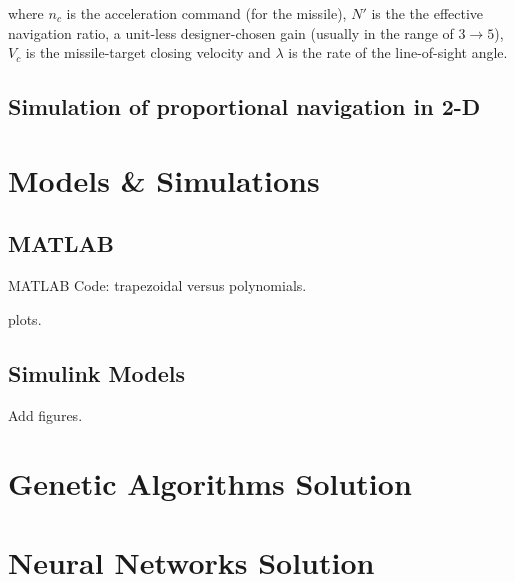 where $n_c$ is the acceleration command (for the missile), $N'$ is the the effective navigation ratio, a unit-less designer-chosen gain (usually in the range of $3 \to 5$), $V_c$ is the missile-target closing velocity and $\lambda$ is the rate of the line-of-sight angle.


\subsection*{Simulation of proportional navigation in 2-D}

\section{Models \& Simulations}

\subsection{MATLAB}
MATLAB Code: trapezoidal versus polynomials.

plots.
\subsection{Simulink Models}

Add figures.

\section{Genetic Algorithms Solution}

\section{Neural Networks Solution}
